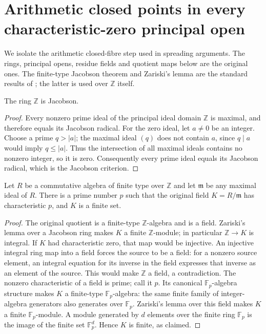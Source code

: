 \section{Arithmetic closed points in every characteristic-zero principal open}

We isolate the arithmetic closed-fibre step used in spreading arguments.
The rings, principal opens, residue fields and quotient maps below are the
original ones. The finite-type Jacobson theorem and Zariski's lemma are the
standard results of \cite{Stacks}; the latter is used over $\mathbb Z$ itself.

\begin{lemma}
\label{lem:arithmetic-integers-jacobson}
\leanok
The ring $\mathbb Z$ is Jacobson.
\end{lemma}
\begin{proof}
Every nonzero prime ideal of the principal ideal domain $\mathbb Z$ is
maximal, and therefore equals its Jacobson radical. For the zero ideal,
let $a\ne0$ be an integer. Choose a prime $q>|a|$; the maximal ideal $(q)$
does not contain $a$, since $q\mid a$ would imply $q\le |a|$.
Thus the intersection of all maximal ideals contains no nonzero integer,
so it is zero. Consequently every prime ideal equals its Jacobson radical,
which is the Jacobson criterion.
\end{proof}

\begin{lemma}
\label{lem:arithmetic-finite-closed-residue}
\leanok
{}
Let $R$ be a commutative algebra of finite type over $\mathbb Z$ and let
$\mathfrak m$ be any maximal ideal of $R$. There is a prime number $p$ such
that the original field $K=R/\mathfrak m$ has characteristic $p$, and $K$
is a finite set.
\end{lemma}
\begin{proof}
The original quotient is a finite-type $\mathbb Z$-algebra and is a field.
Zariski's lemma over a Jacobson ring makes $K$ a finite $\mathbb Z$-module;
in particular $\mathbb Z\to K$ is integral. If $K$ had characteristic zero,
that map would be injective. An injective integral ring map into a field
forces the source to be a field: for a nonzero source element, an integral
equation for its inverse in the field expresses that inverse as an element
of the source. This would make $\mathbb Z$ a field, a contradiction.
The nonzero characteristic of a field is prime; call it $p$. Its canonical
$\mathbb F_p$-algebra structure makes $K$ a finite-type $\mathbb F_p$-algebra:
the same finite family of integer-algebra generators also generates over
$\mathbb F_p$. Zariski's lemma over this field makes $K$ a finite
$\mathbb F_p$-module. A module generated by $d$ elements over the finite ring
$\mathbb F_p$ is the image of the finite set $\mathbb F_p^d$. Hence $K$ is
finite, as claimed.
\end{proof}

